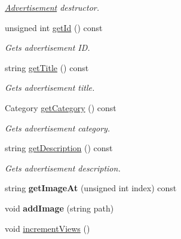 \begin{DoxyCompactItemize}
\begin{DoxyCompactList}\small\item\em \hyperlink{class_advertisement}{Advertisement} destructor. \end{DoxyCompactList}\item 
unsigned int \hyperlink{class_advertisement_aa66d9158d12ae99a04f81cf2adb155fd}{get\+Id} () const 
\begin{DoxyCompactList}\small\item\em Gets advertisement I\+D. \end{DoxyCompactList}\item 
string \hyperlink{class_advertisement_ac65aa68caf2b1697c0cc04f2ebb0fd99}{get\+Title} () const 
\begin{DoxyCompactList}\small\item\em Gets advertisement title. \end{DoxyCompactList}\item 
Category \hyperlink{class_advertisement_a123c05d427fed1ac7fec0f55050da20d}{get\+Category} () const 
\begin{DoxyCompactList}\small\item\em Gets advertisement category. \end{DoxyCompactList}\item 
string \hyperlink{class_advertisement_ac455b4918dbd923af81efbaebf924985}{get\+Description} () const 
\begin{DoxyCompactList}\small\item\em Gets advertisement description. \end{DoxyCompactList}\item 
\hypertarget{class_advertisement_a260fbb1a64495a5e99591202389744a0}{}string {\bfseries get\+Image\+At} (unsigned int index) const \label{class_advertisement_a260fbb1a64495a5e99591202389744a0}

\item 
\hypertarget{class_advertisement_a3925f5b2411ae7ac00a56f3398ae9353}{}void {\bfseries add\+Image} (string path)\label{class_advertisement_a3925f5b2411ae7ac00a56f3398ae9353}

\item 
\hypertarget{class_advertisement_abd20373813b956bac9a6fd78a4947ebc}{}void \hyperlink{class_advertisement_abd20373813b956bac9a6fd78a4947ebc}{increment\+Views} ()\label{class_advertisement_abd20373813b956bac9a6fd78a4947ebc}


\end{DoxyCompactItemize}
